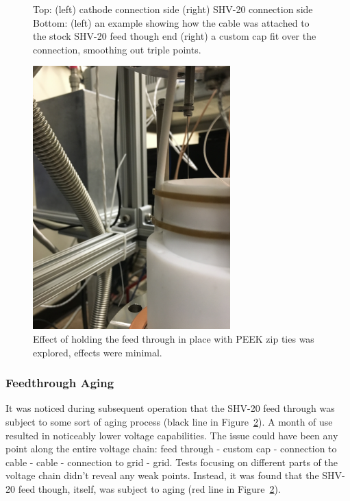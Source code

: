 \begin{figure}[htbp]
\begin{minipage}{0.47\textwidth}
    \end{minipage}
\caption{Top: (left) cathode connection side (right) SHV-20 connection side Bottom: (left) an example showing how the cable was attached to the stock SHV-20 feed though end (right) a custom cap fit over the connection, smoothing out triple points.}
 \label{fig:shv20}
\end{figure}

 \begin{figure}[htbp]
\begin{center}
\includegraphics[width=3in, angle=-90]{figures/testbed/ft3_5.jpg}
\caption{Effect of holding the feed through in place with PEEK zip ties was explored, effects were minimal.}
\label{fig:aging}
\end{center}
\end{figure}


 
\subsubsection{Feedthrough Aging}
It was noticed during subsequent operation that the SHV-20 feed through was subject to some sort of aging process (black line in Figure~\ref{fig:aging}). A month of use resulted in noticeably lower voltage capabilities. The issue could have been any point along the entire voltage chain: feed through - custom cap - connection to cable - cable - connection to grid - grid. Tests focusing on different parts of the voltage chain didn't reveal any weak points. Instead, it was found that the SHV-20 feed though, itself, was subject to aging (red line in Figure~\ref{fig:aging}). 


